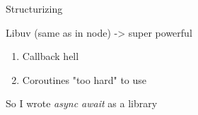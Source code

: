 \documentclass{beamer}
\begin{document}
\begin{frame}{Structurizing}




















	Libuv (same as in node) -> super powerful


	\begin{enumerate}

		\item Callback hell

		\item Coroutines "too hard" to use

	\end{enumerate}


	So I wrote \textit{async await} as a library


\end{frame}
\end{document}
